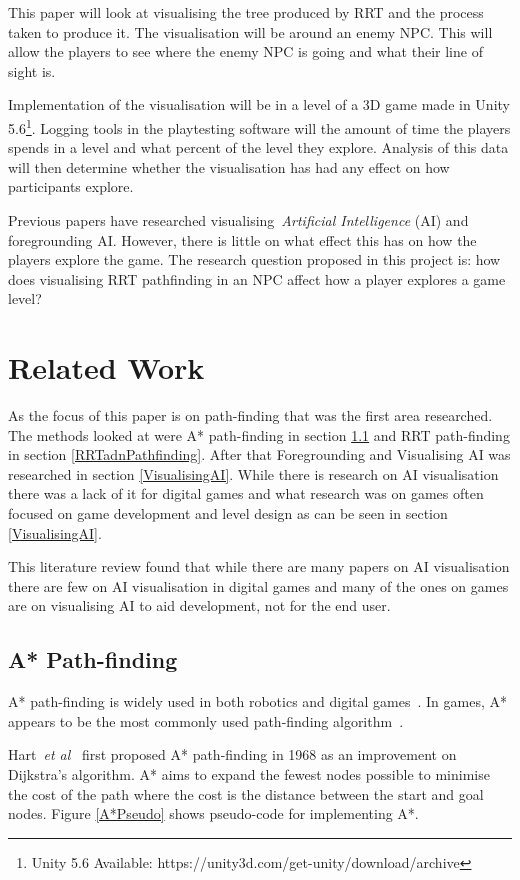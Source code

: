 \documentclass[journal]{IEEEtran}
\begin{document}
	This paper will look at visualising the tree produced by RRT and the process taken to produce it. The visualisation will be around an enemy NPC. This will allow the players to see where the enemy NPC is going and what their line of sight is. 
	
	Implementation of the visualisation will be in a level of a 3D game made in Unity 5.6\footnote[1]{Unity 5.6 Available: https://unity3d.com/get-unity/download/archive}. Logging tools in the playtesting software will the amount of time the players spends in a level and what percent of the level they explore. Analysis of this data will then determine whether the visualisation has had any effect on how participants explore.
	
	Previous papers have researched visualising~\textit{Artificial Intelligence} (AI) and foregrounding AI. However, there is little on what effect this has on how the players explore the game.
	The research question proposed in this project is: how does visualising RRT pathfinding in an NPC affect how a player explores a game level?
	
	\section{Related Work} \label{RelatedWork}
	As the focus of this paper is on path-finding that was the first area researched. The methods looked at were A* path-finding in section \ref{A*PF} and RRT path-finding in section \ref{RRTadnPathfinding}.  After that Foregrounding and Visualising AI was researched in section \ref{VisualisingAI}. While there is research on AI visualisation there was a lack of it for digital games and what research was on games often focused on game development and level design as can be seen in section \ref{VisualisingAI}. 
	
	This literature review found that while there are many papers on AI visualisation there are few on AI visualisation in digital games and many of the ones on games are on visualising AI to aid development, not for the end user. 
	
	
	\subsection{A* Path-finding} \label{A*PF}
	A* path-finding is widely used in both robotics and digital games~\cite{Algfoor2015}. In games, A* appears to be the most commonly used path-finding algorithm~\cite{Algfoor2015}.
	
	Hart~\textit{et al}~\cite{Hart1968} first proposed A* path-finding in 1968 as an improvement on Dijkstra's algorithm. A* aims to expand the fewest nodes possible to minimise the cost of the path where the cost is the distance between the start and goal nodes. Figure \ref{A*Pseudo} shows pseudo-code for implementing A*. 
	
\end{document}
